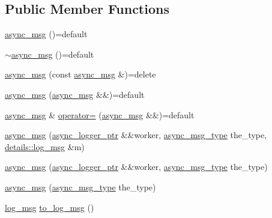 \subsection*{Public Member Functions}
\begin{DoxyCompactItemize}
\item 
\hyperlink{structspdlog_1_1details_1_1async__msg_a1639729ae0bbefc841ec4b87c3369274}{async\+\_\+msg} ()=default
\item 
\hyperlink{structspdlog_1_1details_1_1async__msg_ab4a9c6bb231f8b467f4a9bf43820da45}{$\sim$async\+\_\+msg} ()=default
\item 
\hyperlink{structspdlog_1_1details_1_1async__msg_ac61cf7969d3c60aa377cf4a40df6e6a7}{async\+\_\+msg} (const \hyperlink{structspdlog_1_1details_1_1async__msg}{async\+\_\+msg} \&)=delete
\item 
\hyperlink{structspdlog_1_1details_1_1async__msg_a2e618e34ed69ba387e8e5f069543f94a}{async\+\_\+msg} (\hyperlink{structspdlog_1_1details_1_1async__msg}{async\+\_\+msg} \&\&)=default
\item 
\hyperlink{structspdlog_1_1details_1_1async__msg}{async\+\_\+msg} \& \hyperlink{structspdlog_1_1details_1_1async__msg_a963cf593d81367843c4347603a18c5f8}{operator=} (\hyperlink{structspdlog_1_1details_1_1async__msg}{async\+\_\+msg} \&\&)=default
\item 
\hyperlink{structspdlog_1_1details_1_1async__msg_aa525d6ee1ca7b82755a0f39b62283638}{async\+\_\+msg} (\hyperlink{namespacespdlog_1_1details_a9b6989c16b6150f7e4658ea2aee01bc2}{async\+\_\+logger\+\_\+ptr} \&\&worker, \hyperlink{namespacespdlog_1_1details_a22274995cf879a5d0a08d1f7513ee4fb}{async\+\_\+msg\+\_\+type} the\+\_\+type, \hyperlink{structspdlog_1_1details_1_1log__msg}{details\+::log\+\_\+msg} \&m)
\item 
\hyperlink{structspdlog_1_1details_1_1async__msg_ace5999e830cd28f7b14f804952925379}{async\+\_\+msg} (\hyperlink{namespacespdlog_1_1details_a9b6989c16b6150f7e4658ea2aee01bc2}{async\+\_\+logger\+\_\+ptr} \&\&worker, \hyperlink{namespacespdlog_1_1details_a22274995cf879a5d0a08d1f7513ee4fb}{async\+\_\+msg\+\_\+type} the\+\_\+type)
\item 
\hyperlink{structspdlog_1_1details_1_1async__msg_a466b9eb427b14c12f59afeeeb98c0e01}{async\+\_\+msg} (\hyperlink{namespacespdlog_1_1details_a22274995cf879a5d0a08d1f7513ee4fb}{async\+\_\+msg\+\_\+type} the\+\_\+type)
\item 
\hyperlink{structspdlog_1_1details_1_1log__msg}{log\+\_\+msg} \hyperlink{structspdlog_1_1details_1_1async__msg_a2c5c21ef52bd0b7241ed6ac56f480fd2}{to\+\_\+log\+\_\+msg} ()
\end{DoxyCompactItemize}
